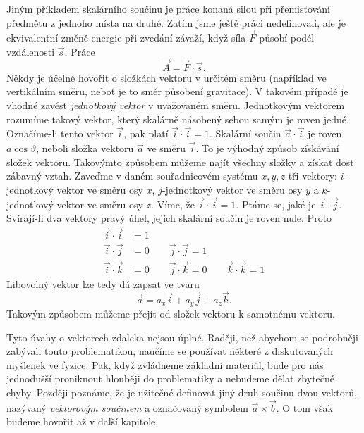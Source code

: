     Jiným příkladem skalárního součinu je práce konaná silou při přemisťování předmětu z jednoho 
    místa na druhé. Zatím jsme ještě práci nedefinovali, ale je ekvivalentní změně energie při 
    zvedání závaží, když síla \(\vec{F}\) působí podél vzdálenosti \(\vec{s}\). Práce
    \begin{equation}\label{FYZ:eq166}
      \vec{A} = \vec{F}\cdot\vec{s}.
    \end{equation}
    Někdy je účelné hovořit o složkách vektoru v určitém směru (například ve vertikálním směru, 
    neboť je to směr působení gravitace). V takovém případě je vhodné zavést \emph{jednotkový 
    vektor} v uvažovaném směru. Jednotkovým vektorem rozumíme takový vektor, který skalárně 
    násobený sebou samým je roven jedné. Označíme-li tento vektor \(\vec{i}\), pak platí 
    \(\vec{i}\cdot\vec{i} = 1\). Skalární součin \(\vec{a}\cdot\vec{i}\) je roven 
    \(a\cos\vartheta\), neboli složka vektoru \(\vec{a}\) ve směru \(\vec{i}\). To je výhodný 
    způsob získávání složek vektoru. Takovýmto způsobem můžeme najít všechny složky a získat dost 
    zábavný vztah. Zaveďme v daném souřadnicovém systému \(x, y, z\) tři vektory: 
    \(i\)-jednotkový vektor ve směru osy \(x\), \(j\)-jednotkový vektor ve směru osy \(y\) a 
    \(k\)-jednotkový vektor ve směru osy \(z\). Víme, že \(\vec{i}\cdot\vec{i} = 1\). Ptáme se, 
    jaké je \(\vec{i}\cdot\vec{j}\). Svírají-li dva vektory pravý úhel, jejich skalární součin je 
    roven nule. Proto
    \begin{align}
      \vec{i}\cdot\vec{i} &= 1                                      \nonumber    \\
      \vec{i}\cdot\vec{j} &= 0 \qquad \vec{j}\cdot\vec{j} = 1       \label{FYZ:eq167} \\
      \vec{i}\cdot\vec{k} &= 0 \qquad \vec{j}\cdot\vec{k} = 0 
                               \qquad \vec{k}\cdot\vec{k} = 1       \nonumber
    \end{align}
    Libovolný vektor lze tedy dá zapsat ve tvaru
    \begin{equation}\label{FYZ:eq168}
      \vec{a} = a_x\vec{i} + a_y\vec{j} + a_z\vec{k}.
    \end{equation}
    Takovým způsobem můžeme přejít od složek vektoru k samotnému vektoru.
    
    Tyto úvahy o vektorech zdaleka nejsou úplné. Raději, než abychom se podrobněji zabývali touto
    problematikou, naučíme se používat některé z diskutovaných myšlenek ve fyzice. Pak, když 
    zvládneme základní materiál, bude pro nás jednodušší proniknout hlouběji do problematiky a 
    nebudeme dělat zbytečné chyby. Později poznáme, že je užitečné definovat jiný druh součinu dvou 
    vektorů, nazývaný \emph{vektorovým součinem} a označovaný symbolem \(\vec{a}\times\vec{b}\). O 
    tom však budeme hovořit až v další kapitole.
    
